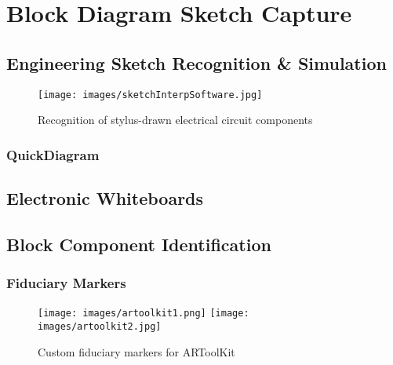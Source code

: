 \clearpage

\section{Block Diagram Sketch Capture}


\subsection{Engineering Sketch Recognition \& Simulation}


\begin{figure}[ht!]
\centering
\texttt{[image: images/sketchInterpSoftware.jpg]}
\caption{Recognition of stylus-drawn electrical circuit components \cite{sketchInterpSoftware}}
\label{im:sketchInterpSoftware}
\end{figure}

\clearpage

\subsubsection{QuickDiagram}


\subsection{Electronic Whiteboards}


\subsection{Block Component Identification}



\subsubsection{Fiduciary Markers}


\begin{figure}[ht!]
\centering
\texttt{[image: images/artoolkit1.png]}
\texttt{[image: images/artoolkit2.jpg]}
\caption{Custom fiduciary markers for ARToolKit \cite{fiducialPic}}
\label{im:fiducialPic}
\end{figure}

